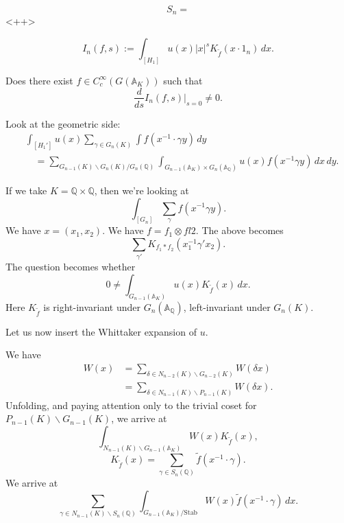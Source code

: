 \documentclass[reqno]{amsart} 
\begin{document}
\begin{equation*}
S_n = 
\end{equation*}<++>


\begin{equation*}
I_n(f, s) := \int_{[H_1]} u(x) \lvert x \rvert^s K_{\tilde{f}}(x \cdot 1_n) \, d x.
\end{equation*}
\begin{question}
  Does there exist $f \in C_c^\infty(G(\mathbb{A}_K))$ such that
  \begin{equation*}
    \frac{d}{d s}
    I_n(f, s)|_{s=0} \neq 0.
  \end{equation*}
\end{question}
Look at the geometric side:
\begin{align*}
  &\int_{[H_1']} u(x) \sum_{\gamma \in G_n(K)} \int f(x^{-1} \cdot \gamma y) \,d y
  \\
  &\quad
    =
    \sum_{G_{n - 1}(K) \backslash G_n(K) / G_n(\mathbb{Q})}
    \int_{G_{n-1}(\mathbb{A}_K) \times G_n(\mathbb{A}_{\mathbb{Q}})} u(x) f(x^{-1} \gamma y) \, d x \, d y.
\end{align*}

If we take $K = \mathbb{Q} \times \mathbb{Q}$, then we're looking at
\begin{equation*}
\int_{[G_n]} \sum_\gamma f(x^{-1} \gamma y).
\end{equation*}
We have $x =(x_1, x_2)$.  We have $f = f_1 \otimes fl2$.  The above becomes
\begin{equation*}
\sum_{\gamma '} K_{f_1 \ast f_2}(x_1^{-1} \gamma ' x_2).
\end{equation*}
The question becomes whether
\begin{equation*}
0 \neq \int_{G_{n - 1}(\mathbb{A}_K)} u(x) K_{\tilde{f}}(x) \,d x.
\end{equation*}
Here $K_{\tilde{f}}$ is right-invariant under $G_n(\mathbb{A}_{\mathbb{Q}})$, left-invariant under $G_n(K)$.

Let us now insert the Whittaker expansion of $u$.

We have
\begin{align*}
  W(x) &= \sum_{\delta \in N_{n - 2}(K) \backslash G_{n - 2}(K)} W(\delta x) \\
       &= \sum_{\delta \in N_{n - 1}(K) \backslash P_{n - 1}(K)} W(\delta x).
\end{align*}
Unfolding, and paying attention only to the trivial coset for $P_{n-1}(K) \backslash G_{n-1}(K)$, we arrive at
\begin{equation*}
  \int_{N_{n - 1}(K) \backslash G_{n - 1}(\mathbb{A}_K)}
  W(x) K_{\tilde{f}}(x),
\end{equation*}
\begin{equation*}
K_{\tilde{f}}(x) = \sum_{\gamma \in S_n(\mathbb{Q})} \tilde{f}(x^{-1} \cdot \gamma).
\end{equation*}
We arrive at
\begin{equation*}
  \sum_{\gamma \in N_{n - 1}(K) \backslash S_n(\mathbb{Q})}
  \int_{G_{n - 1}(\mathbb{A}_K) / \mathrm{Stab}}
  W(x) \tilde{f}(x^{-1} \cdot \gamma) \, d x.
\end{equation*}
\end{document}
